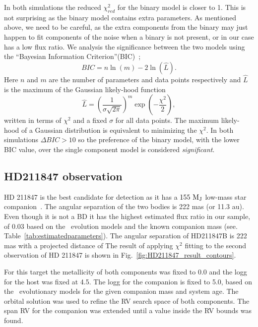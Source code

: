 \documentclass[fleqn,usenatbib]{mnras}
\begin{document}
In both simulations the reduced \(\chi^2_{red}\) for the binary model is closer to 1. This is not surprising as the binary model contains extra parameters. As mentioned above, we need to be careful, as the extra components from the binary may just happen to fit components of the noise when a binary is not present, or in our case has a low flux ratio.
{We analysis the significance between the two models using the ``Bayesian Information Criterion''(BIC)~\citep{schwarz_estimating_1978}; }
\begin{equation}
BIC = n\ln{(m)} - 2\ln{(\hat{L})}.
\end{equation}
{Here $n$ and $m$ are the number of parameters and data points respectively and \(\hat{L}\) is the maximum of the Gaussian likely-hood function }
 \begin{equation}
 \hat{L} = \left(\frac{1}{\sigma \sqrt{2\pi}}\right)^m \exp{\left(-\frac{\chi^2}{2}\right)},
 \end{equation}
 {written in terms of \(\chi^2\) and a fixed $\sigma$ for all data points. The maximum likely-hood of a Gaussian distribution is equivalent to minimizing the \(\chi^2\). In both simulations \(\Delta BIC >10\) so the preference of the binary model, with the lower BIC value, over the single component model is considered \emph{significant}.}

\subsection{HD211847 observation}
\label{subsection:results-hd211847}
{HD 211847} is the best candidate for detection as it has a \(\rm 155~M_J\) low-mass star companion~\citet{moutou_eccentricity_2017}. The angular separation of the two bodies is 222 mas (or 11.3 au). Even though it is not a BD it has the highest estimated flux ratio in our sample, of 0.03 based on the~\citet{baraffe_new_2015} evolution models and the known companion mass (see. Table~\ref{tab:estimatedparameters}). The angular separation of HD211847B is 222 mas with a projected distance of The result of applying \(\chi^2\) fitting to the second observation of {HD 211847} is shown in Fig.~\ref{fig:HD211847_result_contours}.

For this target the metallicity of both components was fixed to 0.0 and the logg for the host was fixed at 4.5. The logg for the companion is fixed to 5.0, based on the~\citet{baraffe_new_2015} evolutionary models for the given companion mass and system age. The orbital solution was used to refine the RV search space of both components. The span RV for the companion was extended until a value inside the RV bounds was found.
\end{document}
